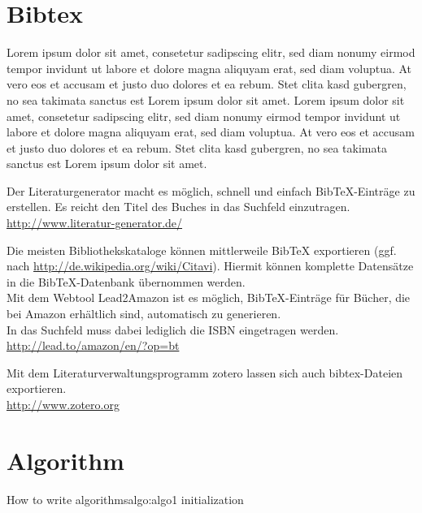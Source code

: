 
\chapter{Bibtex}

Lorem ipsum dolor sit amet, consetetur sadipscing elitr, sed diam nonumy eirmod tempor invidunt ut labore et dolore magna aliquyam erat, sed diam voluptua. At vero eos et accusam et justo duo dolores et ea rebum. Stet clita kasd gubergren, no sea takimata sanctus est Lorem ipsum dolor sit amet. Lorem ipsum dolor sit amet, consetetur sadipscing elitr, sed diam nonumy eirmod tempor invidunt ut labore et dolore magna aliquyam erat, sed diam voluptua. At vero eos et accusam et justo duo dolores et ea rebum. Stet clita kasd gubergren, no sea takimata sanctus est Lorem ipsum dolor sit amet. \cite{bibtex.a}

Der Literaturgenerator macht es möglich, schnell und einfach BibTeX-Einträge zu erstellen.
Es reicht den Titel des Buches in das Suchfeld einzutragen.\\
\url{http://www.literatur-generator.de/}

Die meisten Bibliothekskataloge können mittlerweile BibTeX exportieren (ggf. nach \url{http://de.wikipedia.org/wiki/Citavi}). Hiermit können komplette Datensätze in die BibTeX-Datenbank übernommen werden.\\
Mit dem Webtool Lead2Amazon ist es möglich, BibTeX-Einträge für Bücher, die bei Amazon erhältlich sind, automatisch zu generieren.\\
In das Suchfeld muss dabei lediglich die ISBN eingetragen werden.\\
\url{http://lead.to/amazon/en/?op=bt}

Mit dem Literaturverwaltungsprogramm zotero lassen sich auch bibtex-Dateien exportieren.\\
\url{http://www.zotero.org}

\chapter{Algorithm}

\begin{algo}{How to write algorithms}{algo:algo1}
 initialization\;
\end{algo}

\Blinddocument

\Blinddocument
